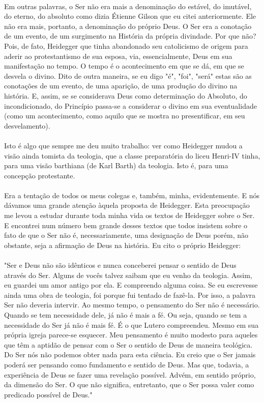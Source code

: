 \documentclass[10pt,a4paper]{book}
\begin{document}
	\\
	Em outras palavras, o Ser não era mais a denominação do estável, do imutável, do eterno, do absoluto como dizia Étienne Gilson que eu citei anteriormente. Ele não era mais, portanto, a denominação do próprio Deus. O Ser era a conotação de um evento, de um surgimento na História da própria divindade. Por que não? Pois, de fato, Heidegger que tinha abandonado seu catolicismo de origem para aderir ao protestantismo de sua esposa, via, essencialmente, Deus em sua manifestação no tempo. O tempo é o acontecimento em que se dá, em que se desvela o divino. Dito de outra maneira, se eu digo "é", "foi", "será" estas são as conotações de um evento, de uma aparição, de uma produção do divino na história. E, assim, se se considerava Deus como determinação do Absoluto, do incondicionado, do Princípio passa-se a considerar o divino em sua eventualidade (como um acontecimento, como aquilo que se mostra no presentificar, em seu desvelamento).\\
	\\
	Isto é algo que sempre me deu muito trabalho: ver como Heidegger mudou a visão ainda tomista da teologia, que a classe preparatória do liceu Henri-IV tinha, para uma visão barthiana (de Karl Barth) da teologia. Isto é, para uma concepção protestante.\\
	\\
	Era a tentação de todos os meus colegas e, também, minha, evidentemente. E nós dávamos uma grande atenção àquela proposta de Heidegger. Esta preocupação me levou a estudar durante toda minha vida os textos de Heidegger sobre o Ser. E encontrei num número bem grande desses textos que todos insistem sobre o fato de que o Ser não é, necessariamente, uma designação de Deus porém, não obstante, seja a afirmação de Deus na história. Eu cito o próprio Heidegger:\\
	\\
	"Ser e Deus não são idênticos e nunca conceberei pensar o sentido de Deus através do Ser. Alguns de vocês talvez saibam que eu venho da teologia. Assim, eu guardei um amor antigo por ela. E compreendo alguma coisa. Se eu escrevesse ainda uma obra de teologia, foi porque fui tentado de fazê-la. Por isso, a palavra Ser não deveria intervir. Ao mesmo tempo, o pensamento do Ser não é necessário. Quando se tem necessidade dele, já não é mais a fé. Ou seja, quando se tem a necessidade do Ser já não é mais fé. É o que Lutero compreendeu. Mesmo em sua própria igreja parece-se esquecer. Meu pensamento é muito modesto para aqueles que têm a aptidão de pensar com o Ser o sentido de Deus de maneira teológica. Do Ser nós não podemos obter nada para esta ciência. Eu creio que o Ser jamais poderá ser pensando como fundamento e sentido de Deus. Mas que, todavia, a experiência de Deus se fazer uma revelação possível. Advém, em sentido próprio, da dimensão do Ser. O que não significa, entretanto, que o Ser possa valer como predicado possível de Deus."\\
\end{document}
